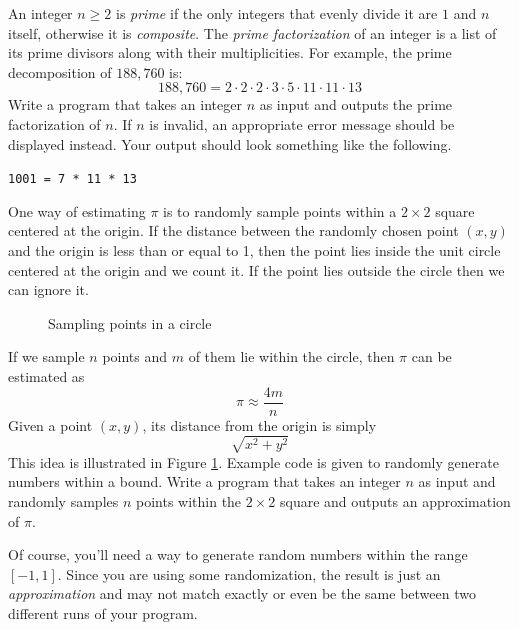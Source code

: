 \begin{exer}
An integer $n \geq 2$ is \emph{prime} if the only integers that evenly divide it are $1$ and $n$ itself, 
otherwise it is \emph{composite}.  The \emph{prime factorization} of an integer is a list of its prime divisors 
along with their multiplicities.  For example, the prime decomposition of $188,760$ is:
  $$188,760 = 2 \cdot 2 \cdot 2 \cdot 3 \cdot 5 \cdot 11 \cdot 11 \cdot 13$$
Write a program that takes an integer $n$ as input and outputs the prime factorization of $n$.
If $n$ is invalid, an appropriate error message should be displayed 
instead.  Your output should look something like the following.

\texttt{1001 = 7 * 11 * 13}
\end{exer}

\begin{exer} 
One way of estimating $\pi$ is to randomly sample points within a $2 \times 2$ square centered
at the origin.  If the distance between the randomly chosen point $(x, y)$ and the origin is less than or
equal to 1, then the point lies inside the unit circle centered at the origin and we count it.  If the 
point lies outside the circle then we can ignore it.  
\begin{figure}[h]
\centering

\caption{Sampling points in a circle}
\label{fig:circleSample}
\end{figure}
If we sample $n$ points and $m$ of them lie within the circle, then $\pi$ can be estimated as
 $$\pi \approx \frac{4m}{n}$$
Given a point $(x, y)$, its distance from the origin is simply
  $$\sqrt{x^2 + y^2}$$
This idea is illustrated in Figure \ref{fig:circleSample}.  Example code is given to randomly generate 
numbers within a bound.  Write a program that takes an integer $n$ as input and 
randomly samples $n$ points within the $2 \times 2$ square and outputs an approximation of $\pi$.

Of course, you'll need a way to generate random numbers within the range $[-1, 1]$.  Since you are
using some randomization, the result is just an \emph{approximation} and may not match exactly or
even be the same between two different runs of your program.
\end{exer}

